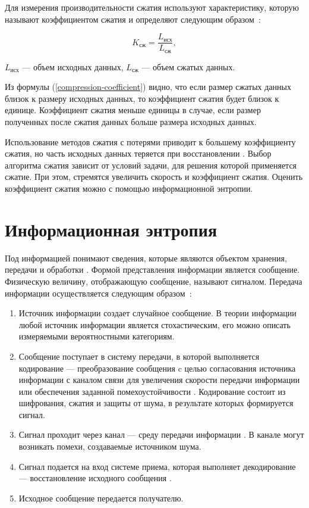 Для измерения производительности сжатия используют характеристику, которую называют коэффициентом сжатия и определяют следующим образом~\cite{compression-coefficient}:

\begin{equation}\label{compression-coefficient}
	K_{\text{сж}} = \frac{L_{\text{исх}}}{L_{\text{сж}}},
\end{equation}

 $L_{\text{исх}}$ --- объем исходных данных, $L_{\text{сж}}$ --- объем сжатых данных.

Из формулы (\ref{compression-coefficient}) видно, что если размер сжатых данных близок к размеру исходных данных, то коэффициент сжатия будет близок к единице. Коэффициент сжатия меньше единицы в случае, если размер полученных после сжатия данных больше размера исходных данных.

Использование методов сжатия с потерями приводит к большему коэффициенту сжатия, но часть исходных данных теряется при восстановлении \cite{compression-definition}. Выбор алгоритма сжатия зависит от условий задачи, для решения которой применяется сжатие. При этом, стремятся увеличить скорость и коэффициент сжатия. Оценить коэффициент сжатия можно с помощью информационной энтропии.

\section{Информационная энтропия}\label{ientropy}

Под информацией понимают сведения, которые являются объектом хранения, передачи и обработки \cite{information}. Формой представления информации является сообщение. Физическую величину, отображающую сообщение, называют сигналом. Передача информации осуществляется следующим образом~\cite{transmission}:

\begin{enumerate}
	\item Источник информации создает случайное сообщение. В теории информации любой источник информации является стохастическим, его можно описать измеряемыми вероятностными категориям.
	\item Сообщение поступает в систему передачи, в которой выполняется кодирование --- преобразование сообщения c целью согласования источника информации с каналом связи для увеличения скорости передачи информации или обеспечения заданной помехоустойчивости  \cite{information}. Кодирование состоит из шифрования, сжатия и защиты от шума, в результате которых формируется сигнал. 
	\item Сигнал проходит через канал --- среду передачи информации \cite{transmission}. В канале могут возникать помехи, создаваемые источником шума.
	\item Сигнал подается на вход системе приема, которая выполняет декодирование --- восстановление исходного сообщения \cite{information}.
	\item Исходное сообщение передается получателю.
\end{enumerate}


